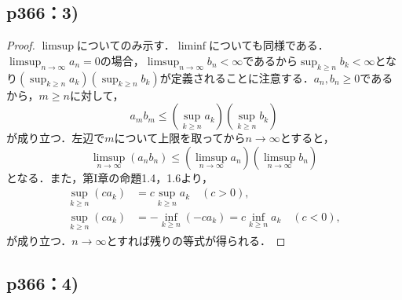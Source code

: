 \documentclass[a4paper,10pt,fleqn]{ltjsarticle}
\begin{document}
\subsection*{p366：3)}

  \begin{leftbar}
    \begin{proof}
      $\limsup$についてのみ示す．$\liminf$についても同様である．
      $\limsup_{n \to \infty} a_n = 0$の場合，$\limsup_{n \to \infty} b_n < \infty$であるから$\sup_{k \geq n} b_k < \infty$となり$\left(\sup _{k \geq n} a_k\right) \left(\sup _{k \geq n} b_k\right)$が定義されることに注意する．$a_n, b_n \geq 0$であるから，$m \geq n$に対して，
      \[
        a_m b_m \leq \left(\sup _{k \geq n} a_k\right) \left(\sup _{k \geq n} b_k\right)
      \]
      が成り立つ．左辺で$m$について上限を取ってから$n \to \infty$とすると，
      \[
        \limsup_{n \to \infty} (a_n b_n) \leq \left(\limsup _{n \to \infty} a_n\right) \left(\limsup_{n \to \infty} b_n\right)
      \]
      となる．また，第I章の命題1.4，1.6より，
      \begin{align*}
        \sup_{k \geq n} (c a_k) &= c\sup_{k \geq n} a_k \quad (c > 0), \\
        \sup_{k \geq n} (c a_k) &= -\inf_{k \geq n} (-c a_k) = c\inf_{k \geq n} a_k \quad (c < 0),
      \end{align*}
      が成り立つ．$n \to \infty$とすれば残りの等式が得られる．
    \end{proof}
  \end{leftbar}

  \subsection*{p366：4)}
\end{document}
